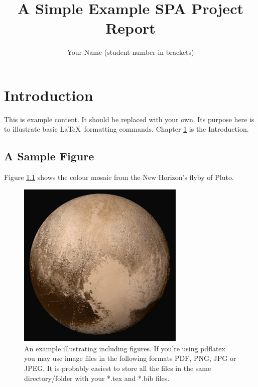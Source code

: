 \documentclass[twoside,fontsize=12pt,
     bibliography=totoc, %
     listof=totoc,       %
     index=totoc,        %
     onehalfspacing      %
]{SPAProjectReport}
\title{A Simple Example SPA Project Report}
\author{Your Name (student number in brackets) }
\begin{document}

\maketitle
{}
\setcounter{tocdepth}{5}
\tableofcontents           %
\listoffigures             %
\listoftables              %

\newpage                   %
\cleardoublepage
{}     %


\chapter{Introduction}
\label{sec:intro}

This is example content.  It should be replaced with your own.  Its
purpose here is to illustrate basic \LaTeX\ formatting commands.
Chapter \ref{sec:intro} is the Introduction. 
   
\section{A Sample Figure}
Figure \ref{fig:pluto} shows the colour mosaic from the New Horizon's
flyby of Pluto. 
\begin{figure}[hbtp]
  \begin{center}
  \includegraphics[width=80mm]{diagrams/Example-Image.jpg}  %
  \caption[Example Figure of Pluto]{An example illustrating including figures.  If you're using
    pdflatex you  may use image files in the following formats PDF,
    PNG, JPG or JPEG.  It is probably easiest to store all the files
    in the same directory/folder with your *.tex and *.bib files.} 
  \label{fig:pluto}
  \end{center}
\end{figure}
\end{document}
